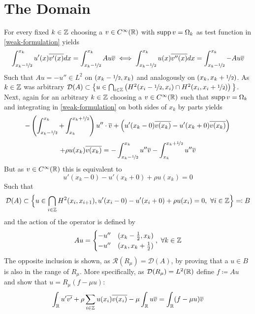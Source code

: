 \chapter{The Domain}

For every fixed $k \in \mathbb{Z}$ choosing a $v \in C^{\infty}(\mathbb{R})$ with $\operatorname{supp} v = \Omega_{k}$ as test function in \eqref{weak-formulation} yields
	\[ \int_{x_{k}-\nicefrac{1}{2}}^{x_{k}} u'(x) \overline{v'(x)} dx = \int_{x_{k}-\nicefrac{1}{2}}^{x_{k}} A u \overline{v} \iff \int_{x_{k}-\nicefrac{1}{2}}^{x_{k}} u(x) \overline{v''(x)} dx = \int_{x_{k}-\nicefrac{1}{2}}^{x_{k}} - A u \overline{v} \]
Such that $A u = - u'' \in L^{2}$ on $(x_{k} -\nicefrac{1}{2}, x_{k})$ and analogously on $(x_{k}, x_{k} + \nicefrac{1}{2})$.
As $k \in \mathbb{Z}$ was arbitrary $\mathcal{D}(A) \subset \big\{ u \in \bigcap_{i \in \mathbb{Z}} \left( H^{2}(x_{i}-\nicefrac{1}{2}, x_{i}) \cap H^{2}(x_{i}, x_{i} + \nicefrac{1}{2}) \right)\big\}$. \\
Next, again for an arbitrary $k \in \mathbb{Z}$ choosing a $v \in C^{\infty}(\mathbb{R})$ such that $\operatorname{supp} v = \Omega_{k}$ and integrating in \eqref{weak-formulation} on both sides of $x_{k}$ by parts yields
	\[ -\left( \int_{x_{k}-\nicefrac{1}{2}}^{x_{k}} + \int_{x_{k}}^{x_{k} + \nicefrac{1}{2}}\right) u'' \cdot \overline{v} + \left( u'(x_{k}-0) \overline{v(x_{k})} - u'(x_{k} + 0) \overline{v(x_{k})} \right) \\ \]
	\[ +  \rho u(x_{k})\overline{v(x_{k})} = - \int_{x_{k} - \nicefrac{1}{2}}^{x_{k}} u'' \overline{v} - \int_{x_{k}}^{x_{k} + \nicefrac{1}{2}} u'' \overline{v} \]
But as $v \in C^{\infty}(\mathbb{R})$ this is equivalent to
	\[ u'(x_{k}-0) - u'(x_{k}+0) + \rho u(x_{k}) = 0 \]
Such that
	\begin{align*}
		\mathcal{D}(A) \subset \Big\{ u \in \bigcap_{i \in \mathbb{Z}} H^{2}(x_{i}, x_{i + 1}), u'(x_{i} - 0) - u'(x_{i} + 0) + \rho u(x_{i}) = 0 , ~\forall i \in \mathbb{Z} \Big\} \eqqcolon B
	\end{align*} 
and the action of the operator is defined by
	\[ A u = \begin{cases}
					- u'' & (x_{k} - \frac{1}{2}, x_{k}) \\
					- u'' & (x_{k}, x_{k} + \frac{1}{2})
				\end{cases}, ~\forall k \in \mathbb{Z} \]
The opposite inclusion is shown, as $\mathcal{R}(R_{\mu}) = \mathcal{D}(A)$, by proving that a $u \in B$ is also in the range of $R_{\mu}$. More specifically, as $\mathcal{D}(R_{\mu}) = L^{2}(\mathbb{R})$ define $f \coloneqq A u$ and show that $u = R_{\mu}(f - \mu u)$:
	\[ \int_{\mathbb{R}} u' \overline{v'} + \rho \sum_{i \in \mathbb{Z}} u(x_{i}) \overline{v(x_{i})} - \mu \int_{\mathbb{R}} u \overline{v}= \int_{\mathbb{R}}(f-\mu u) \overline{v} \]
